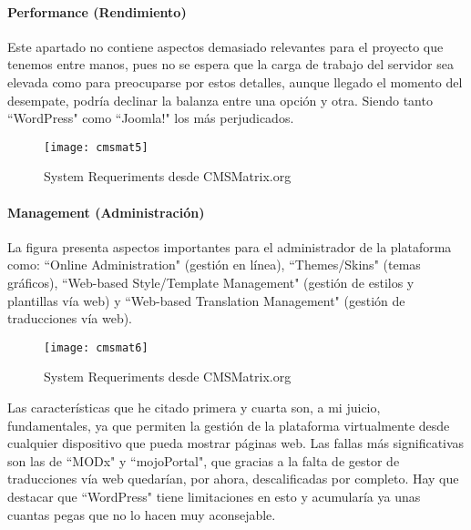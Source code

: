 \paragraph{Performance (Rendimiento)}

\par Este apartado no contiene aspectos demasiado relevantes para el proyecto que tenemos entre manos, pues no se espera que la carga de trabajo del servidor sea elevada como para preocuparse por estos detalles, aunque llegado el momento del desempate, podría declinar la balanza entre una opción y otra. Siendo tanto ``WordPress" como ``Joomla!" los más perjudicados.

\begin{figure}
\begin{narrow}{-0.2\linewidth}{-0.2\linewidth}
\centering
\texttt{[image: cmsmat5]}
\caption{System Requeriments desde CMSMatrix.org}
\end{narrow}
\label{fig:cmsmat1}
\end{figure}


\paragraph{Management (Administración)}

\par La figura presenta aspectos importantes para el administrador de la plataforma como: ``Online Administration" (gestión en línea), ``Themes/Skins" (temas gráficos), ``Web-based Style/Template Management" (gestión de estilos y plantillas vía web) y ``Web-based Translation Management" (gestión de traducciones vía web).

\begin{figure}
\begin{narrow}{-0.2\linewidth}{-0.2\linewidth}
\centering
\texttt{[image: cmsmat6]}
\caption{System Requeriments desde CMSMatrix.org}
\end{narrow}
\label{fig:cmsmat1}
\end{figure}

\par Las características que he citado primera y cuarta son, a mi juicio, fundamentales, ya que permiten la gestión de la plataforma virtualmente desde cualquier dispositivo que pueda mostrar páginas web. Las fallas más significativas son las de ``MODx" y ``mojoPortal", que gracias a la falta de gestor de traducciones vía web quedarían, por ahora, descalificadas por completo. Hay que destacar que ``WordPress" tiene limitaciones en esto y acumularía ya unas cuantas pegas que no lo hacen muy aconsejable.


